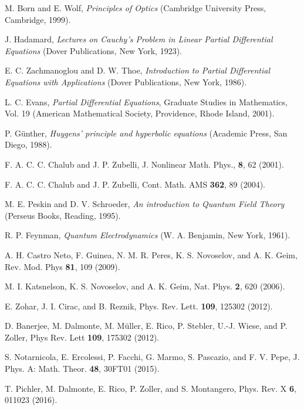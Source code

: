 \begin{thebibliography}{}

M. Born and E. Wolf, \textit{Principles of Optics} (Cambridge University Press, Cambridge, 1999).

J. Hadamard, \textit{Lectures on Cauchy's Problem in Linear Partial Differential Equations} (Dover Publications, New York, 1923).

E. C. Zachmanoglou and D. W. Thoe, \textit{Introduction to Partial Differential Equations with Applications} (Dover Publications, New York, 1986).

L. C. Evans, \textit{Partial Differential Equations}, Graduate Studies in Mathematics, Vol. 19 (American
Mathematical Society, Providence, Rhode Island, 2001).

P. G\"unther, \textit{Huygens' principle and hyperbolic equations} (Academic Press, San Diego, 1988). 

F. A. C. C. Chalub and J. P. Zubelli, J. Nonlinear Math. Phys., \textbf{8}, 62 (2001).

F. A. C. C. Chalub and J. P. Zubelli, 
Cont. Math. AMS \textbf{362}, 89 (2004).

M. E. Peskin and D. V. Schroeder, \textit{An introduction to Quantum Field Theory} (Perseus Books, Reading, 1995).

R. P. Feynman, \textit{Quantum Electrodynamics} (W. A. Benjamin, New York, 1961).

A. H. Castro Neto, F. Guinea, N. M. R. Peres, K. S. Novoselov, and A. K. Geim, Rev. Mod. Phys \textbf{81}, 109 (2009).

M. I. Katsnelson, K. S. Novoselov, and A. K. Geim, Nat. Phys. \textbf{2}, 620 (2006).

E. Zohar, J. I. Cirac, and B. Reznik, Phys. Rev. Lett. \textbf{109}, 125302 (2012).

D. Banerjee, M. Dalmonte, M. M\"uller, E. Rico, P. Stebler, U.-J. Wiese, and P. Zoller, Phys Rev. Lett \textbf{109}, 175302 (2012).

S. Notarnicola, E. Ercolessi, P. Facchi, G. Marmo, S. Pascazio, and F. V. Pepe, 
J. Phys. A: Math. Theor. \textbf{48}, 30FT01 (2015). 

T. Pichler, M. Dalmonte, E. Rico, P. Zoller, and S. Montangero, Phys. Rev. X \textbf{6}, 011023 (2016).

\end{thebibliography}


